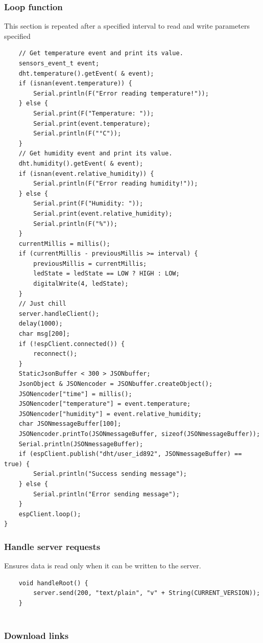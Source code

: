 \subsubsection{Loop function}
This section is repeated after a specified interval to read and write parameters specified
\begin{lstlisting}
	// Get temperature event and print its value.
	sensors_event_t event;
	dht.temperature().getEvent( & event);
	if (isnan(event.temperature)) {
		Serial.println(F("Error reading temperature!"));
	} else {
		Serial.print(F("Temperature: "));
		Serial.print(event.temperature);
		Serial.println(F("°C"));
	}
	// Get humidity event and print its value.
	dht.humidity().getEvent( & event);
	if (isnan(event.relative_humidity)) {
		Serial.println(F("Error reading humidity!"));
	} else {
		Serial.print(F("Humidity: "));
		Serial.print(event.relative_humidity);
		Serial.println(F("%"));
	}
	currentMillis = millis();
	if (currentMillis - previousMillis >= interval) {
		previousMillis = currentMillis;
		ledState = ledState == LOW ? HIGH : LOW;
		digitalWrite(4, ledState);
	}
	// Just chill
	server.handleClient();
	delay(1000);
	char msg[200];
	if (!espClient.connected()) {
		reconnect();
	}
	StaticJsonBuffer < 300 > JSONbuffer;
	JsonObject & JSONencoder = JSONbuffer.createObject();
	JSONencoder["time"] = millis();
	JSONencoder["temperature"] = event.temperature;
	JSONencoder["humidity"] = event.relative_humidity;
	char JSONmessageBuffer[100];
	JSONencoder.printTo(JSONmessageBuffer, sizeof(JSONmessageBuffer));
	Serial.println(JSONmessageBuffer);
	if (espClient.publish("dht/user_id892", JSONmessageBuffer) == true) {
		Serial.println("Success sending message");
	} else {
		Serial.println("Error sending message");
	}
	espClient.loop();
}

\end{lstlisting}


\subsubsection{Handle server requests}
Ensures data is read only when it can be written to the server. 
\begin{lstlisting}
	void handleRoot() {
		server.send(200, "text/plain", "v" + String(CURRENT_VERSION));
	}
	
\end{lstlisting}
\subsubsection{Download links}

